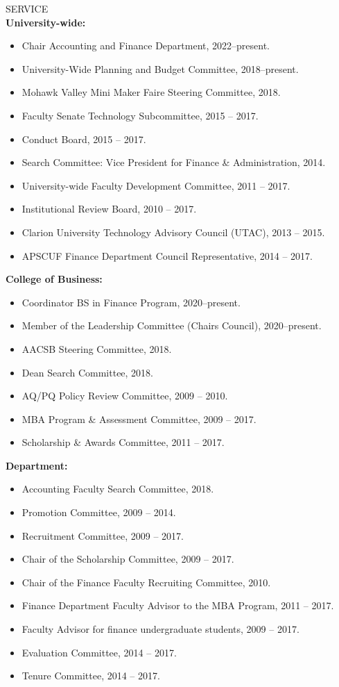 \documentclass[9pt]{article}
\begin{document}
\vspace{10pt}
SERVICE \\
{\bf University-wide:}
\begin{itemize}[noitemsep, nolistsep]
\item Chair Accounting and Finance Department, 2022--present.
\item University-Wide Planning and Budget Committee, 2018--present.
\item Mohawk Valley Mini Maker Faire Steering Committee, 2018.
\item Faculty Senate Technology Subcommittee, 2015 -- 2017.
\item Conduct Board, 2015 -- 2017.
\item Search Committee: Vice President for Finance \& Administration, 2014.
\item University-wide Faculty Development Committee, 2011 -- 2017.
\item Institutional Review Board, 2010 -- 2017. 
\item Clarion University Technology Advisory Council (UTAC), 2013 -- 2015. 
\item APSCUF Finance Department Council Representative, 2014 -- 2017. 
\end{itemize}
{\bf College of Business:}
\begin{itemize}[noitemsep, nolistsep]
\item Coordinator BS in Finance Program, 2020--present.
\item Member of the Leadership Committee (Chairs Council), 2020--present.
\item AACSB Steering Committee, 2018.
\item Dean Search Committee, 2018.
\item AQ/PQ Policy Review Committee, 2009 -- 2010.
\item MBA Program \& Assessment Committee, 2009 -- 2017.
\item Scholarship \& Awards Committee, 2011 -- 2017.
\end{itemize}
{\bf Department:}
\begin{itemize}[noitemsep, nolistsep]
\item Accounting Faculty Search Committee, 2018.
\item Promotion Committee, 2009 -- 2014.
\item Recruitment Committee, 2009 -- 2017.
\item Chair of the Scholarship Committee, 2009 -- 2017.
\item Chair of the Finance Faculty Recruiting Committee, 2010.
\item Finance Department Faculty Advisor to the MBA Program, 2011 -- 2017.
\item Faculty Advisor for finance undergraduate students, 2009 -- 2017.
\item Evaluation Committee, 2014 -- 2017.
\item Tenure Committee, 2014 -- 2017.
\end{itemize}
\end{document}
